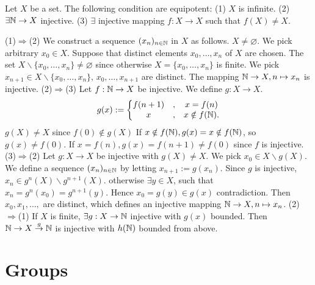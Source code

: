 \documentclass{book}
\numberwithin{equation}{section}
\begin{document}
\begin{propositionenv}
    Let $X$ be a set. The following condition are equipotent:
    \newline
    (1) $X$ is infinite.
    \newline
    (2) $\exists \mathbb{N}\rightarrow X$ injective.
    \newline
    (3) $\exists$ injective mapping $f:X\rightarrow X$ such that $f(X)\not=X$.
\end{propositionenv}
\begin{proofenv}
    \quad
    \newline
    (1)$\Rightarrow$(2) We construct a sequence $(x_n)_{n\in \mathbb{N}}$ in $X$ as follows. $X\not=\varnothing$. We pick arbitrary $x_0\in X$. Suppose that distinct elements $x_0,\dots, x_n$ of $X$ are chosen. The set $X\backslash\{x_0,\dots,x_n\}\not=\varnothing$ since otherwise $X=\{x_0,\dots,x_n\}$ is finite. We pick $x_{n+1}\in X\backslash\{x_0,\dots,x_n\},\, x_0,\dots,x_{n+1}$ are distinct. The mapping $\mathbb{N}\rightarrow X, n\mapsto x_n$ is injective.
    \newline
    (2)$\Rightarrow$(3) Let $f:\mathbb{N}\rightarrow X$ be injective. We define $g:X\rightarrow X$.
    $$g(x):=
\left\{\begin{matrix}
 f(n+1)&, &x=f(n) \\
x&,&x\notin f(\mathbb{N}).
\end{matrix}\right. $$
$g(X)\not=X$ since $f(0)\notin g(X)$ If $x\notin f(\mathbb{N}),g(x)=x\notin f(\mathbb{N})$, so $g(x)\not=f(0)$. If $x=f(n), g(x)=f(n+1)\not=f(0)$ since $f$ is injective.
\newline
(3)$\Rightarrow$(2) Let $g:X\rightarrow X$ be injective with $g(X)\not=X$. We pick $x_0\in X\backslash g(X)$. We define a sequence $(x_n)_{n\in\mathbb{N}}$ by letting $x_{n+1}:=g(x_n)$. Since $g$ is injective, $x_n\in g^n(X)\backslash g^{n+1}(X)$. otherwise $\exists y\in X$, such that $x_n=g^{n}(x_0)=g^{n+1}(y)$. Hence $x_0=g(y)\in g(x)$ contradiction. Then $x_0,x_1,\dots,$ are distinct, which defines an injective mapping $\mathbb{N}\rightarrow X,n\mapsto x_n$.
\newline
(2)$\Rightarrow$(1) If $X$ is finite, $\exists g:X\rightarrow\mathbb{N}$ injective with $g(x)$ bounded. Then $\mathbb{N}\rightarrow X\overset{g}{\rightarrow}\mathbb{N}$ is injective with $h(\mathbb{N})$ bounded from above.
\end{proofenv}

\chapter{Groups}
\end{document}
